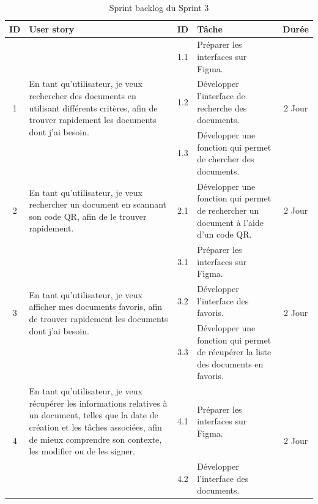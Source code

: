 \begin{adjustwidth}{-1cm}{}
    
    \begin{longtable}{|c|p{6cm}|c|p{6cm}|c|}
      \caption{Sprint backlog du Sprint 3} \label{tab:sprint-backlog-3} \\
      \hline
      \textbf{ID} & \textbf{User story} & \textbf{ID}  & \textbf{Tâche} & \textbf{Durée} \\
      \hline
      \multirow{3}{*}{1} & \multirow{3}{6cm}{En tant qu'utilisateur, je veux rechercher des documents en utilisant différents critères, afin de trouver rapidement les documents dont j'ai besoin.} & 1.1 & Préparer les interfaces sur Figma. & \multirow{3}{*}{2 Jour} \\
      \cline{3-4}
      & & 1.2 & Développer l'interface de recherche des documents. & \\
      \cline{3-4}
      & & 1.3 & Développer une fonction qui permet de chercher des documents. & \\
      \cline{1-5}
      2 & En tant qu'utilisateur, je veux rechercher un document en scannant son code QR, afin de le trouver rapidement. & 2.1 & Développer une fonction qui permet de rechercher un document à l'aide d'un code QR. & 2 Jour \\
      \cline{1-5}
      \multirow{3}{*}{3} & \multirow{3}{6cm}{En tant qu'utilisateur, je veux afficher mes documents favoris, afin de trouver rapidement les documents dont j'ai besoin.}  & 3.1 & Préparer les interfaces sur Figma. & \multirow{3}{*}{2 Jour} \\
      \cline{3-4}
      & & 3.2 & Développer l'interface des favoris. & \\
      \cline{3-4}
      & & 3.3 & Développer une fonction qui permet de récupérer la liste des documents en favoris. & \\
      \cline{1-5}
      \multirow{4}{*}{4} & En tant qu'utilisateur, je veux récupérer les informations relatives à un document, telles que la date de création et les tâches associées, afin de mieux comprendre son contexte, les modifier ou de les signer. & 4.1 & Préparer les interfaces sur Figma. & \multirow{3}{*}{2 Jour} \\
      \cline{3-4}
      & & 4.2 & Développer l'interface des documents. & \\
      \cline{3-4}

\end{longtable}
\end{adjustwidth}
